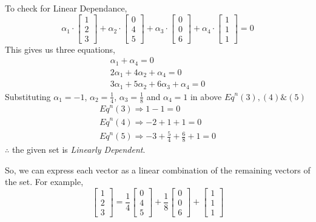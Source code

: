 \documentclass[a4paper]{article}
\begin{document}
\begin{qalist}
			To check for Linear Dependance,
			\begin{equation}
				{\alpha}_{1}\cdot\left[\begin{matrix}1 \\ 2 \\ 3\end{matrix}\right] + 
				{\alpha}_{2}\cdot\left[\begin{matrix}0 \\ 4 \\ 5\end{matrix}\right] + 
				{\alpha}_{3}\cdot\left[\begin{matrix}0 \\ 0 \\ 6\end{matrix}\right] + 
				{\alpha}_{4}\cdot\left[\begin{matrix}1 \\ 1 \\ 1\end{matrix}\right]
				 = 0
			\end{equation}
			This gives us three equations, 
			\begin{align}
				{\alpha}_{1} + {\alpha}_{4}= 0 \\
				2{\alpha}_{1} + 4{\alpha}_{2} + {\alpha}_{4}= 0 \\
				3{\alpha}_{1} + 5{\alpha}_{2} + 6{\alpha}_{3} + {\alpha}_{4}= 0
			\end{align}
			Substituting ${\alpha}_{1} = -1$, ${\alpha}_{2} = \frac{1}{4}$, ${\alpha}_{3} = \frac{1}{8}$ and ${\alpha}_{4} = 1$ in above ${Eq}^{n} (3), (4) \& (5)$
			\begin{align}
				{Eq}^{n} (3) \Rightarrow 1 - 1 = 0 \\
				{Eq}^{n} (4) \Rightarrow -2 + 1 + 1 = 0 \\
				{Eq}^{n} (5) \Rightarrow -3 + \frac{5}{4} + \frac{6}{8} + 1 = 0
			\end{align}
			$\therefore$ the given set is \textit{Linearly Dependent}. 
			
			So, we can express each vector as a linear combination of the remaining vectors of the set.
			For example, 
			\begin{equation}
				\left[\begin{matrix}1 \\ 2 \\ 3\end{matrix}\right] = 
				\frac{1}{4}\left[\begin{matrix}0 \\ 4 \\ 5\end{matrix}\right] +
				\frac{1}{8}\left[\begin{matrix}0 \\ 0 \\ 6\end{matrix}\right] +
				\left[\begin{matrix}1 \\ 1 \\ 1\end{matrix}\right]
			\end{equation}
			

\end{qalist}
\end{document}
